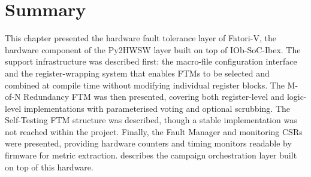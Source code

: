 \section{Summary}
\label{chap6:summary}

This chapter presented the hardware fault tolerance layer of \ac{Fatori-V}, the hardware component of the Py2HWSW layer built on top of IOb-\ac{SoC}-Ibex. The support infrastructure was described first: the macro-file configuration interface and the register-wrapping system that enables \acp{FTM} to be selected and combined at compile time without modifying individual register blocks. The M-of-N Redundancy \ac{FTM} was then presented, covering both register-level and logic-level implementations with parameterised voting and optional scrubbing. The Self-Testing \ac{FTM} structure was described, though a stable implementation was not reached within the project. Finally, the Fault Manager and monitoring \acp{CSR} were presented, providing hardware counters and timing monitors readable by firmware for metric extraction.  describes the campaign orchestration layer built on top of this hardware.
